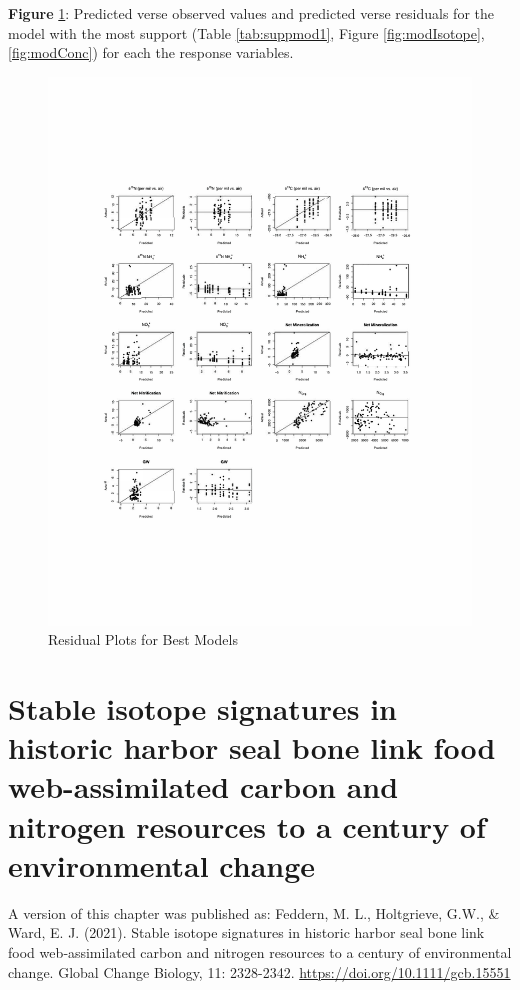 \documentclass [11pt, proquest] {uwthesis}[2015/03/03]
\begin{document}
\textbf{Figure} \ref{fig:ch1resid}: Predicted verse observed values and
predicted verse residuals for the model with the most support (Table
\ref{tab:suppmod1}, Figure \ref{fig:modIsotope}, \ref{fig:modConc}) for
each the response variables. \newline 
\begin{figure}[h]
  \includegraphics[width=1\textwidth]{figure/Ch1/ch1residuals.pdf}
  \caption{Residual Plots for Best Models}
  \label{fig:ch1resid}
\end{figure}
\chapter{Stable isotope signatures in historic harbor seal bone link
food web-assimilated carbon and nitrogen resources to a century of
environmental
change}\label{stable-isotope-signatures-in-historic-harbor-seal-bone-link-food-web-assimilated-carbon-and-nitrogen-resources-to-a-century-of-environmental-change}

A version of this chapter was published as: Feddern, M. L., Holtgrieve,
G.W., \& Ward, E. J. (2021). Stable isotope signatures in historic
harbor seal bone link food web‐assimilated carbon and nitrogen resources
to a century of environmental change. Global Change Biology, 11:
2328-2342. \url{https://doi.org/10.1111/gcb.15551}
\end{document}
